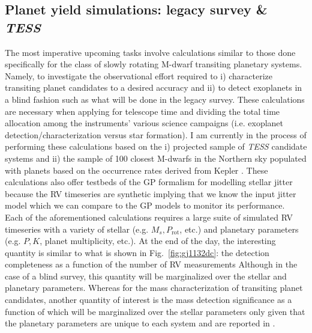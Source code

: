 \subsection{Planet yield simulations: \spirou{} legacy survey \& \emph{TESS}}   
The most imperative upcoming tasks involve calculations similar to those done 
specifically for the class of slowly rotating M-dwarf transiting planetary systems. 
Namely, to investigate the observational effort required to i) characterize transiting 
planet candidates to a desired accuracy and ii) to detect exoplanets in 
a blind fashion such as what will be done in the \spirou{} legacy survey. These 
calculations are necessary when applying for telescope time and dividing the total 
time allocation among the instruments' various science campaigns (i.e. exoplanet 
detection/characterization versus star formation). I am currently in the process of 
performing these calculations based on the i) projected sample of \emph{TESS} candidate 
systems \parencite{sullivan15} 
and ii) the sample of 100 closest M-dwarfs in the Northern sky populated with 
planets based on the occurrence rates derived from Kepler \parencite{dressing15a}. 
These calculations also offer testbeds of the GP formalism for modelling stellar 
jitter because the RV timeseries are synthetic implying that we know the input 
jitter model 
which we can compare to the GP models to monitor its performance. \\

Each of the aforementioned calculations requires a large suite of simulated RV timeseries 
with a variety of stellar (e.g. $M_s, P_{\mathrm{rot}}$, etc.) and planetary parameters 
(e.g. $P,K$, planet multiplicity, etc.). At the end of the day, the interesting quantity 
is similar to what is shown in Fig.~\ref{fig:gj1132dc}: the detection completeness 
as a function of the number of RV measurements  
Although in the case of a blind survey, 
this quantity will be marginalized over the stellar and planetary parameters. Whereas 
for the 
mass characterization of transiting planet candidates, another quantity of interest is 
the mass detection significance as a function of \nobs{,} which will be marginalized over 
the stellar parameters only given that the planetary parameters are unique to each 
system and are reported in \cite{sullivan15}. \\

